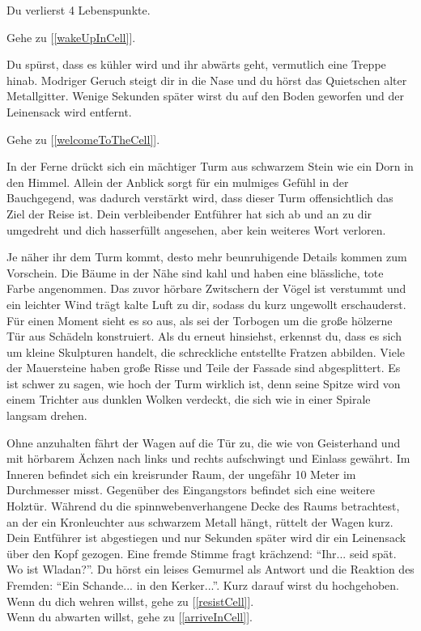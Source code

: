 Du verlierst 4 Lebenspunkte.

Gehe zu [\ref{wakeUpInCell}].


Du spürst, dass es kühler wird und ihr abwärts geht, vermutlich eine Treppe hinab. Modriger Geruch steigt dir in die Nase und du hörst das Quietschen alter Metallgitter. Wenige Sekunden später wirst du auf den Boden geworfen und der Leinensack wird entfernt.

Gehe zu [\ref{welcomeToTheCell}].


In der Ferne drückt sich ein mächtiger Turm aus schwarzem Stein wie ein Dorn in den Himmel. Allein der Anblick sorgt für ein mulmiges Gefühl in der Bauchgegend, was dadurch verstärkt wird, dass dieser Turm offensichtlich das Ziel der Reise ist. Dein verbleibender Entführer hat sich ab und an zu dir umgedreht und dich hasserfüllt angesehen, aber kein weiteres Wort verloren.

Je näher ihr dem Turm kommt, desto mehr beunruhigende Details kommen zum Vorschein. Die Bäume in der Nähe sind kahl und haben eine blässliche, tote Farbe angenommen. Das zuvor hörbare Zwitschern der Vögel ist verstummt und ein leichter Wind trägt kalte Luft zu dir, sodass du kurz ungewollt erschauderst. Für einen Moment sieht es so aus, als sei der Torbogen um die große hölzerne Tür aus Schädeln konstruiert. Als du erneut hinsiehst, erkennst du, dass es sich um kleine Skulpturen handelt, die schreckliche entstellte Fratzen abbilden. Viele der Mauersteine haben große Risse und Teile der Fassade sind abgesplittert. Es ist schwer zu sagen, wie hoch der Turm wirklich ist, denn seine Spitze wird von einem Trichter aus dunklen Wolken verdeckt, die sich wie in einer Spirale langsam drehen.

Ohne anzuhalten fährt der Wagen auf die Tür zu, die wie von Geisterhand und mit hörbarem Ächzen nach links und rechts aufschwingt und Einlass gewährt. Im Inneren befindet sich ein kreisrunder Raum, der ungefähr 10 Meter im Durchmesser misst. Gegenüber des Eingangstors befindet sich eine weitere Holztür. Während du die spinnwebenverhangene Decke des Raums betrachtest, an der ein Kronleuchter aus schwarzem Metall hängt, rüttelt der Wagen kurz. Dein Entführer ist abgestiegen und nur Sekunden später wird dir ein Leinensack über den Kopf gezogen. Eine fremde Stimme fragt krächzend: ``Ihr... seid spät. Wo ist Wladan?''. Du hörst ein leises Gemurmel als Antwort und die Reaktion des Fremden: ``Ein Schande... in den Kerker...''. Kurz darauf wirst du hochgehoben.
\\Wenn du dich wehren willst, gehe zu [\ref{resistCell}].
\\Wenn du abwarten willst, gehe zu [\ref{arriveInCell}].

